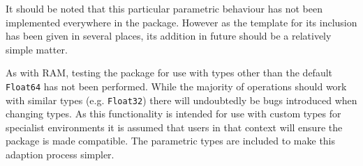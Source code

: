 It should be noted that this particular parametric behaviour has not been implemented everywhere in the package. However as the template for its inclusion has been given in several places, its addition in future should be a relatively simple matter. 

As with RAM, testing the package for use with types other than the default \texttt{Float64} has not been performed. While the majority of operations should work with similar types (e.g. \texttt{Float32}) there will undoubtedly be bugs introduced when changing types. As this functionality is intended for use with custom types for specialist environments it is assumed that users in that context will ensure the package is made compatible. The parametric types are included to make this adaption process simpler.

